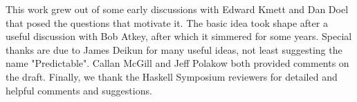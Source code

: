 \documentclass[sigplan,screen]{acmart}
\newenvironment{code}
 {\VerbatimEnvironment
  \begin{verbatim}}
 {\end{verbatim}}
\begin{document}
\begin{acks}
This work grew out of some early discussions with Edward Kmett and Dan Doel that posed the questions that motivate it. The basic idea took shape after a useful discussion with Bob Atkey, after which it simmered for some years. Special thanks are due to James Deikun for many useful ideas, not least suggesting the name "Predictable". Callan McGill and Jeff Polakow both provided comments on the draft. Finally, we thank the Haskell Symposium reviewers for detailed and helpful comments and suggestions. 
\end{acks}



\newpage
 \nocite{*}
%  
 


  
\begin{comment}
\begin{code}    


z :: [Writer (DLast Int) Int]  
z = [tellit 1, tellit 2, tellit 3]
  where tellit x = tell (DLast . Now $ (Just x)) >> pure x
  
zx = Bistream (listToStream  (cycle z)) (listToStream (cycle $ drop 1 z))  

zz :: [Writer (DFirst Int) Int]  
zz = [tellit 17, tellit 1, tellit 2, tellit 3]
  where tellit x = tell (DFirst . Now $ (Just x)) >> pure x
  
zzx = Bistream (listToStream  (cycle zz)) (listToStream (cycle $ drop 1 zz))  

zzz :: [Writer (PStream Int) Int]
zzz = [tellit 1, tellit 2, tellit 3]
  where tellit x = tell (PCons x PNil) >> pure x
  
quux :: [State Int Int]
quux = [get]



deriving instance Show a => Show (Delay a)
deriving instance Functor Stream
  

\end{code}
\end{comment}
\end{document}
